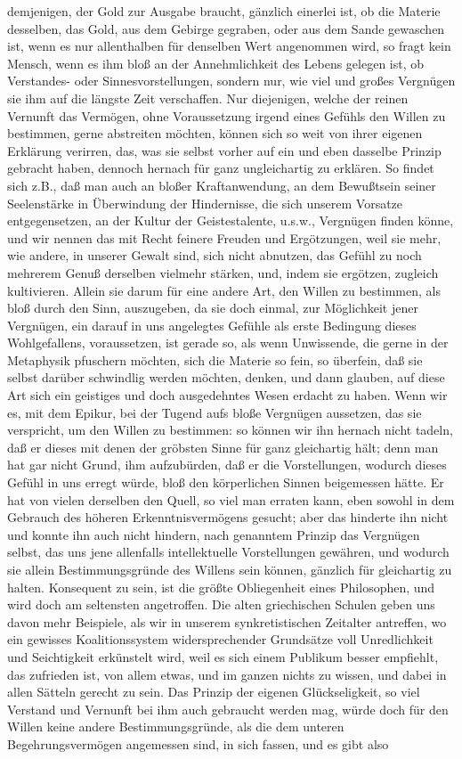 \documentclass[a4paper,12pt,twoside]{book}
\begin{document}
demjenigen, der Gold zur Ausgabe  braucht, gänzlich einerlei ist, ob die Materie desselben, das Gold, aus dem Gebirge gegraben, oder aus dem Sande gewaschen ist, wenn es nur allenthalben für denselben Wert angenommen wird, so fragt kein Mensch, wenn es ihm bloß an der Annehmlichkeit des Lebens gelegen ist, ob Verstandes- oder Sinnesvorstellungen, sondern nur, wie viel und großes Vergnügen sie ihm auf die längste Zeit verschaffen. Nur diejenigen, welche der reinen Vernunft das Vermögen, ohne Voraussetzung irgend eines Gefühls den Willen zu bestimmen, gerne abstreiten möchten, können sich so weit von ihrer eigenen Erklärung verirren, das, was sie selbst vorher auf ein und eben dasselbe Prinzip gebracht haben, dennoch hernach für ganz ungleichartig zu erklären. So findet sich z.B., daß man auch an bloßer Kraftanwendung, an dem Bewußtsein seiner Seelenstärke in Überwindung der Hindernisse, die sich unserem Vorsatze entgegensetzen, an der Kultur der Geistestalente, u.s.w., Vergnügen finden könne, und wir nennen das mit Recht feinere Freuden und Ergötzungen, weil sie mehr, wie andere, in unserer Gewalt sind, sich nicht abnutzen, das Gefühl zu noch mehrerem Genuß derselben vielmehr stärken, und, indem sie ergötzen, zugleich kultivieren. Allein sie darum für eine andere Art, den Willen zu bestimmen, als bloß durch den Sinn, auszugeben, da sie doch einmal, zur Möglichkeit jener Vergnügen, ein darauf in uns angelegtes Gefühle als erste Bedingung dieses Wohlgefallens, voraussetzen, ist gerade so, als wenn Unwissende, die gerne in der Metaphysik pfuschern möchten, sich die Materie so fein, so überfein, daß sie selbst darüber schwindlig werden möchten, denken, und dann glauben, auf diese Art sich ein geistiges und doch ausgedehntes Wesen erdacht zu haben. Wenn wir es, mit dem Epikur, bei der Tugend aufs bloße Vergnügen aussetzen, das sie verspricht, um den Willen zu bestimmen: so können wir ihn hernach nicht tadeln, daß er dieses mit denen der gröbsten Sinne für ganz gleichartig hält; denn man hat gar nicht Grund, ihm aufzubürden, daß er die Vorstellungen, wodurch dieses Gefühl in uns erregt würde, bloß den körperlichen Sinnen beigemessen hätte. Er hat von vielen derselben  den Quell, so viel man erraten kann, eben sowohl in dem Gebrauch des höheren Erkenntnisvermögens gesucht; aber das hinderte ihn nicht und konnte ihn auch nicht hindern, nach genanntem Prinzip das Vergnügen selbst, das uns jene allenfalls intellektuelle Vorstellungen gewähren, und wodurch sie allein Bestimmungsgründe des Willens sein können, gänzlich für gleichartig zu halten. Konsequent zu sein, ist die größte Obliegenheit eines Philosophen, und wird doch am seltensten angetroffen. Die alten griechischen Schulen geben uns davon mehr Beispiele, als wir in unserem synkretistischen Zeitalter antreffen, wo ein gewisses Koalitionssystem widersprechender Grundsätze voll Unredlichkeit und Seichtigkeit erkünstelt wird, weil es sich einem Publikum besser empfiehlt, das zufrieden ist, von allem etwas, und im ganzen nichts zu wissen, und dabei in allen Sätteln gerecht zu sein. Das Prinzip der eigenen Glückseligkeit, so viel Verstand und Vernunft bei ihm auch gebraucht werden mag, würde doch für den Willen keine andere Bestimmungsgründe, als die dem unteren Begehrungsvermögen angemessen sind, in sich fassen, und es gibt also 
\end{document}
